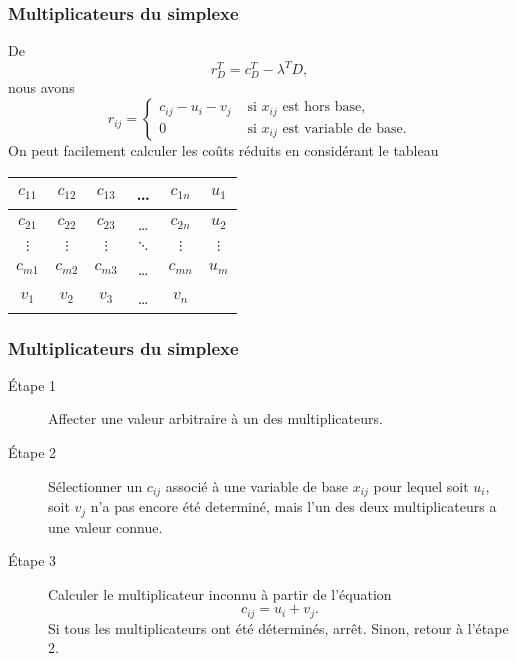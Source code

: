 \documentclass[usepdftitle=false]{beamer}
\begin{document}
\begin{frame}
\frametitle{Multiplicateurs du simplexe}

De
\[
r_D^T = c_D^T - \lambda^T D,
\]
nous avons
\[
r_{ij} =
\begin{cases}
c_{ij} - u_i - v_j &  \text{ si $x_{ij}$ est hors base,} \\
0 & \text{ si $x_{ij}$ est variable de base.}
\end{cases}
\]
On peut facilement calculer les coûts réduits en considérant le tableau
\begin{center}
\begin{tabular}{|c|c|c|c|c|c|}
\hline
$c_{11}$ & $c_{12}$ & $c_{13}$ & \ldots & $c_{1n}$ & $u_1$ \\
\hline
$c_{21}$ & $c_{22}$ & $c_{23}$ & \ldots & $c_{2n}$ & $u_2$ \\
\hline
$\vdots$ & $\vdots$ & $\vdots$ & $\ddots$ & $\vdots$ & $\vdots$ \\
\hline
$c_{m1}$ & $c_{m2}$ & $c_{m3}$ & \ldots & $c_{mn}$ & $u_m$ \\
\hline
$v_1$ & $v_2$ & $v_3$ & \ldots & $v_n$ & \\
\hline
\end{tabular}
\end{center}

\end{frame}

\begin{frame}
\frametitle{Multiplicateurs du simplexe}

\begin{description}
\item[\'Etape 1]
Affecter une valeur arbitraire à un des multiplicateurs.
\item[\'Etape 2]
Sélectionner un $c_{ij}$ associé à une variable de base $x_{ij}$ pour lequel soit $u_i$, soit $v_j$ n'a pas encore été determiné, mais l'un des deux multiplicateurs a une valeur connue.
\item[\'Etape 3]
Calculer le multiplicateur inconnu à partir de l'équation
\[
c_{ij} = u_i + v_j.
\]
Si tous les multiplicateurs ont été déterminés, arrêt. Sinon, retour à l'étape 2.
\end{description}

\end{frame}
\end{document}
